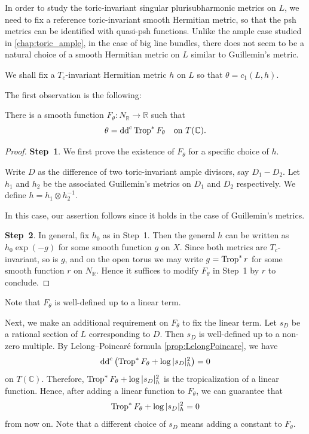 In order to study the toric-invariant singular plurisubharmonic metrics on $L$, we need to fix a reference toric-invariant smooth Hermitian metric, so that the psh metrics can be identified with quasi-psh functions.
Unlike the ample case studied in \cref{chap:toric_ample}, in the case of big line bundles, there does not seem to be a natural choice of a smooth Hermitian metric on $L$ similar to Guillemin's metric.


We shall fix a $T_c$-invariant Hermitian metric $h$ on $L$ so that $\theta=c_1(L,h)$.

The first observation is the following:
\begin{lemma}\label{lma:exist_Ftheta}
    There is a smooth function $F_{\theta}\colon N_{\mathbb{R}}\rightarrow \mathbb{R}$ such that
    \[
        \theta=\mathrm{dd}^{\mathrm{c}} \operatorname{Trop}^*F_{\theta}\quad\textup{on }T(\mathbb{C}).
    \]
\end{lemma}
\begin{proof}
    \textbf{Step~1}. We first prove the existence of $F_{\theta}$ for a specific choice of $h$.

    Write $D$ as the difference of two toric-invariant ample divisors, say $D_1-D_2$. Let $h_1$ and $h_2$ be the associated Guillemin's metrics on $D_1$ and $D_2$ respectively. We define $h=h_1\otimes h_2^{-1}$.

    In this case, our assertion follows since it holds in the case of Guillemin's metrics.

    \textbf{Step~2}. In general, fix $h_0$ as in Step~1. Then the general $h$ can be written as $h_0\exp(-g)$ for some smooth function $g$ on $X$. Since both metrics are $T_c$-invariant, so is $g$, and on the open torus we may write $g=\operatorname{Trop}^* r$ for some smooth function $r$ on $N_{\mathbb{R}}$.
    Hence it suffices to modify $F_{\theta}$ in Step~1 by $r$ to conclude.
\end{proof}
Note that $F_{\theta}$ is well-defined up to a linear term.

Next, we make an additional requirement on $F_{\theta}$ to fix the linear term. Let $s_D$ be a rational section of $L$ corresponding to $D$. Then $s_D$ is well-defined up to a non-zero multiple. By Lelong--Poincaré formula \cref{prop:LelongPoincare}, we have
\[
\mathrm{dd}^{\mathrm{c}}\left( \operatorname{Trop}^*F_{\theta}+\log |s_D|_h^2 \right)=0
\]
on $T(\mathbb{C})$. Therefore, $\operatorname{Trop}^*F_{\theta}+\log |s_D|_h^2$ is the tropicalization of a linear function. Hence, after adding a linear function to $F_{\theta}$, we can guarantee that
\begin{equation}\label{eq:normF0}
\operatorname{Trop}^*F_{\theta}+\log |s_D|_h^2=0
\end{equation}
from now on. Note that a different choice of $s_D$ means adding a constant to $F_{\theta}$.

